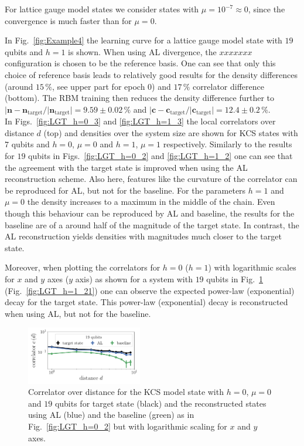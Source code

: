 \documentclass[pra,aps,showpacs,groupedaddress,superscriptaddress,twocolumn,toc=flat,biblatex,footinbib]{revtex4-1}
\renewcommand{\vec}[1]{\bm{#1}}
\begin{document}
For lattice gauge model states we consider states with $\mu=10^{-7}\approx 0$, since the convergence is much faster than for $\mu=0$. 

In Fig.~\ref{fig:Example4} the learning curve for a lattice gauge model state with $19$ qubits and $h=1$ is shown. When using AL divergence, the $xxxxxxx$ configuration is chosen to be the reference basis. One can see that only this choice of reference basis leads to relatively good results for the density differences (around $15\,\%$, see upper part for epoch $0$) and $17\,\%$ correlator difference (bottom). The RBM training then reduces the density difference further to $\vert \vec{n}-\vec{n}_{\mathrm{target}}/\vert \vec{n}_{\mathrm{target}}\vert= 9.59\pm 0.02\,\%$ and $\vert \vec{c}-\vec{c}_{\mathrm{target}}/\vert \vec{c}_{\mathrm{target}}\vert= 12.4\pm 0.2\,\%$. \\

In Figs.~\ref{fig:LGT_h=0_3} and \ref{fig:LGT_h=1_3} the local correlators over distance $d$ (top) and densities over the system size are shown for KCS states with $7$ qubits and $h=0$, $\mu=0$ and $h=1$, $\mu=1$ respectively. Similarly to the results for $19$ qubits in Figs.~\ref{fig:LGT_h=0_2} and \ref{fig:LGT_h=1_2} one can see that the agreement with the target state is improved when using the AL reconstruction scheme. Also here, features like the curvature of the correlator can be reproduced for AL, but not for the baseline. For the parameters $h=1$ and $\mu=0$ the density increases to a maximum in the middle of the chain. Even though this behaviour can be reproduced by AL and baseline, the results for the baseline are of a around half of the magnitude of the target state. In contrast, the AL reconstruction yields densities with magnitudes much closer to the target state.

Moreover, when plotting the correlators for $h=0$ ($h=1$) with logarithmic scales for $x$ and $y$ axes ($y$ axis) as shown for a system with $19$ qubits in Fig.~\ref{fig:LGT_h=0_21} (Fig.~\ref{fig:LGT_h=1_21}) one can observe the expected power-law (exponential) decay for the target state. This power-law (exponential) decay is reconstructed when using AL, but not for the baseline.




\begin{figure}[t]
	\centering
   \includegraphics[width=0.45\textwidth]{Paper/Graphics/LGT_different_threshold_correlator_19_qubits_log.pdf}
	\caption[]{Correlator over distance for the KCS model state with $h=0$, $\mu=0$ and $19$ qubits for target state (black) and the reconstructed states using AL (blue) and the baseline (green) as in Fig.~\ref{fig:LGT_h=0_2} but with logarithmic scaling for $x$ and $y$ axes.}
	\label{fig:LGT_h=0_21}
\end{figure}
\end{document}

